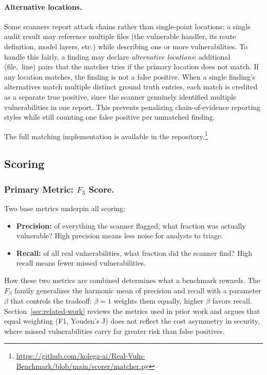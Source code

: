 \paragraph{Alternative locations.}
Some scanners report attack chains rather than single-point locations: a single audit result may reference multiple files (the vulnerable handler, its route definition, model layers, etc.) while describing one or more vulnerabilities. To handle this fairly, a finding may declare \emph{alternative locations}: additional (file,~line) pairs that the matcher tries if the primary location does not match. If any location matches, the finding is not a false positive. When a single finding's alternatives match multiple distinct ground truth entries, each match is credited as a separate true positive, since the scanner genuinely identified multiple vulnerabilities in one report. This prevents penalizing chain-of-evidence reporting styles while still counting one false positive per unmatched finding.

The full matching implementation is available in the repository.\footnote{\url{https://github.com/kolega-ai/Real-Vuln-Benchmark/blob/main/scorer/matcher.py}}

\subsection{Scoring}
\label{sec:scoring}

\subsubsection{Primary Metric: $F_3$ Score.}

Two base metrics underpin all scoring:

\begin{itemize}
  \item \textbf{Precision:} of everything the scanner flagged, what fraction was actually vulnerable? High precision means less noise for analysts to triage.
  \item \textbf{Recall:} of all real vulnerabilities, what fraction did the scanner find? High recall means fewer missed vulnerabilities.
\end{itemize}

\noindent
How these two metrics are combined determines what a benchmark rewards. The $F_\beta$ family generalizes the harmonic mean of precision and recall with a parameter $\beta$ that controls the tradeoff: $\beta = 1$ weights them equally, higher $\beta$ favors recall. Section~\ref{sec:related-work} reviews the metrics used in prior work and argues that equal weighting (F1, Youden's J) does not reflect the cost asymmetry in security, where missed vulnerabilities carry far greater risk than false positives.

